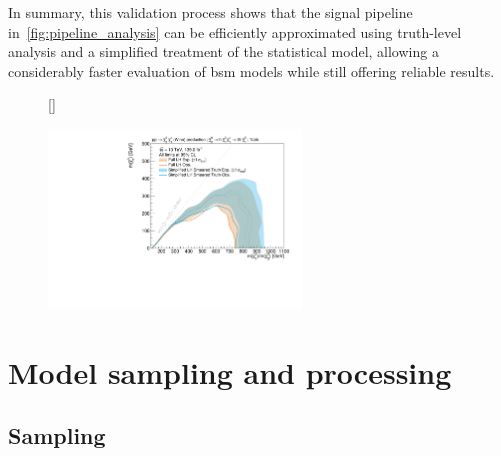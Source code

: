 In summary, this validation process shows that the signal pipeline in~\cref{fig:pipeline_analysis} can be efficiently approximated using truth-level analysis and a simplified treatment of the statistical model, allowing a considerably faster evaluation of \gls{bsm} models while still offering reliable results. 

\begin{figure}
[\FBwidth]
{\caption{}\label{fig:simplified_truth_result}}
{\includegraphics[width=0.60\textwidth]{exclusion_1Lbb_truthInput_BkgSignal_700_200_noLabel}}
\end{figure}

\section{Model sampling and processing}\label{sec:pmssm_sampling}


\subsection{Sampling}

